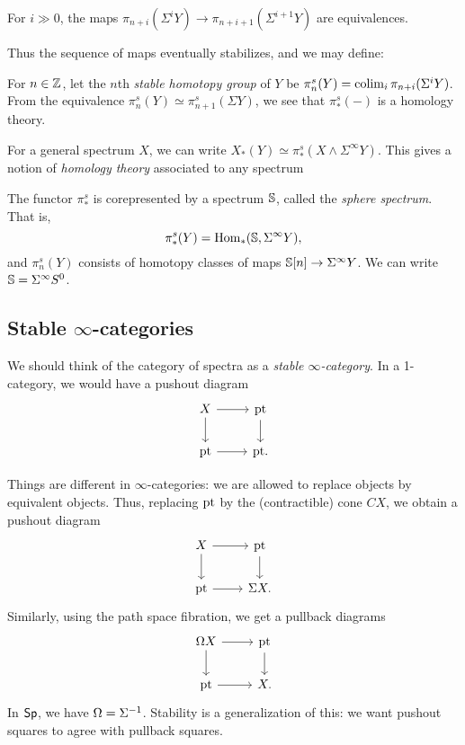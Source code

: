 \documentclass{article}
\begin{document}
\begin{thm}
	For $i \gg 0$, the maps $\pi_{n+i}(\Sigma^i Y) \to \pi_{n+i+1}(\Sigma^{i+1} Y)$ are equivalences.
\end{thm}

Thus the sequence of maps eventually stabilizes, and we may define:

\begin{dfn}
	For $n \in \mathbb{Z}$, let the $n$th \emph{stable homotopy group} of $Y$ be $\pi_n^s(Y) = \operatorname*{colim}_i \pi_{n+i}(\Sigma^i Y)$.
	From the equivalence $\pi_n^s(Y) \simeq \pi_{n+1}^s(\Sigma Y)$, we see that $\pi_*^s(-)$ is a homology theory.
\end{dfn}

For a general spectrum $X$, we can write $X_*(Y) \simeq \pi_*^s(X \wedge \Sigma^\infty Y)$.
This gives a notion of \emph{homology theory} associated to any spectrum

The functor $\pi_*^s$ is corepresented by a spectrum $\mathbb{S}$, called the \emph{sphere spectrum}.
That is,
\[
	\pi_*^s(Y) = \operatorname{Hom}_*(\mathbb{S}, \Sigma^\infty Y),
\]
and $\pi_n^s(Y)$ consists of homotopy classes of maps $\mathbb{S}[n] \to \Sigma^\infty Y$.
We can write $\mathbb{S} = \Sigma^\infty S^0$.

\subsection{Stable $\infty$-categories}

We should think of the category of spectra as a \emph{stable $\infty$-category}.
In a 1-category, we would have a pushout diagram
\[
	\begin{tikzcd}
		X \rar \dar & \pt \dar \\
		\pt \rar & \pt.
	\end{tikzcd}
\]

Things are different in $\infty$-categories: we are allowed to replace objects by equivalent objects.
Thus, replacing $\mathrm{pt}$ by the (contractible) cone $CX$, we obtain a pushout diagram
\[
	\begin{tikzcd}
		X \rar \dar & \pt \dar \\
		\pt \rar & \Sigma X.
	\end{tikzcd}
\]
Similarly, using the path space fibration, we get a pullback diagrams
\[
	\begin{tikzcd}
		\Omega X \rar \dar & \pt \dar \\
		\pt \rar & X.
	\end{tikzcd}
\]
In $\mathsf{Sp}$, we have $\Omega = \Sigma^{-1}$.
Stability is a generalization of this: we want pushout squares to agree with pullback squares.
\end{document}
